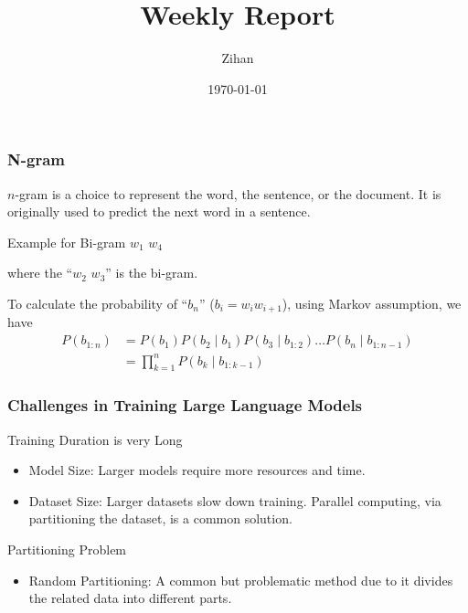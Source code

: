 \documentclass[serif]{beamer}
\title{Weekly Report}
\author{Zihan}
\date{\today}
\begin{document}
\begin{frame}
    \frametitle{N-gram}

    $n$-gram is a choice to represent the word, the sentence, or the document. It is originally used to predict the next word in a sentence.

    \begin{block}{Example for Bi-gram}
        $w_1$  $w_4$

        where the ``$w_2$ $w_3$'' is the bi-gram.
    \end{block}

    To calculate the probability of ``$b_n$'' ($b_i = w_iw_{i+1}$), using Markov assumption, we have
    \begin{align*}
        P\left(b_{1: n}\right) & =P\left(b_1\right) P\left(b_2 \mid b_1\right) P\left(b_3 \mid b_{1: 2}\right) \ldots P\left(b_n \mid b_{1: n-1}\right) \\
                               & =\prod_{k=1}^n P\left(b_k \mid b_{1: k-1}\right)
    \end{align*}

\end{frame}


\begin{frame}
    \frametitle{Challenges in Training Large Language Models}
    \begin{block}{Training Duration is very Long}
        \begin{itemize}
            \item Model Size: Larger models require more resources and time.
            \item Dataset Size: Larger datasets slow down training. Parallel computing, via partitioning the dataset, is a common solution.
        \end{itemize}
    \end{block}

    \begin{block}{Partitioning Problem}
        \begin{itemize}
            \item Random Partitioning: A common but problematic method due to it divides the related data into different parts.
        \end{itemize}
    \end{block}

\end{frame}
\end{document}
